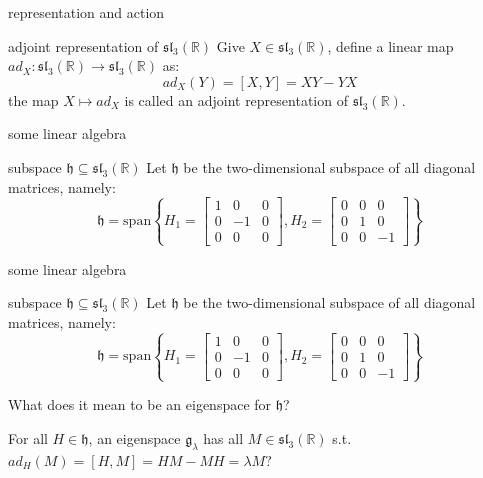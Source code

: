 \documentclass{beamer}
\newcommand{\R}{\mathbb{R}}
\newcounter{mytheorem}[section] \def\themytheorem{\thesection.\arabic{mytheorem}}
\begin{document}
\begin{frame}{representation and action}
	\begin{defn}{adjoint representation of $\mathfrak{sl}_3(\R)$}{}
		Give $X \in \mathfrak{sl}_3(\R)$, define a linear map $ad_X : \mathfrak{sl}_3(\R) \to \mathfrak{sl}_3(\R)$ as: \[
			ad_X(Y) = [X,Y] = XY - YX
		\] the map $X \mapsto ad_X$ is called an adjoint representation of $\mathfrak{sl}_3(\R)$.
	\end{defn} 
\end{frame}

\begin{frame}{some linear algebra}
	\begin{defn}{subspace $\mathfrak{h} \subseteq \mathfrak{sl}_3(\R)$}{}
		Let  $\mathfrak{h}$ be the two-dimensional subspace of all diagonal matrices, namely:  \[
			\mathfrak{h} = \text{span}{\left\{ H_1 = \begin{bmatrix} 1 & 0 &0 \\ 0 & -1 & 0 \\ 0 &0 &0 \end{bmatrix}, H_2 = \begin{bmatrix} 0 &0 &0 \\ 0 &1&0 \\ 0&0&-1 \end{bmatrix}   \right\} }
		\] 
	\end{defn}
\end{frame}


\addtocounter{mytheorem}{-1}
\begin{frame}{some linear algebra}
	\begin{defn}{subspace $\mathfrak{h} \subseteq \mathfrak{sl}_3(\R)$}{}
		Let  $\mathfrak{h}$ be the two-dimensional subspace of all diagonal matrices, namely:  \[
			\mathfrak{h} = \text{span}{\left\{ H_1 = \begin{bmatrix} 1 & 0 &0 \\ 0 & -1 & 0 \\ 0 &0 &0 \end{bmatrix}, H_2 = \begin{bmatrix} 0 &0 &0 \\ 0 &1&0 \\ 0&0&-1 \end{bmatrix}   \right\} }
		\] 
	\end{defn}
	What does it mean to be an eigenspace for $\mathfrak{h}$?

	For all $H \in \mathfrak{h}$, an eigenspace $\mathfrak{g}_{\lambda}$ has all $M \in \mathfrak{sl}_{3}(\R)$ s.t. $ad_{H}(M) = [H,M] = HM-MH = \lambda M?$
\end{frame}
\end{document}
